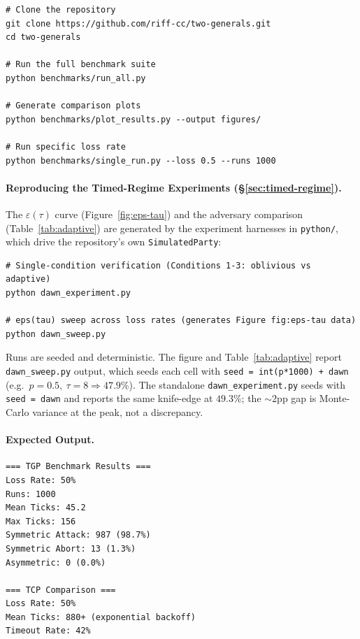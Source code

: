 \begin{verbatim}
# Clone the repository
git clone https://github.com/riff-cc/two-generals.git
cd two-generals

# Run the full benchmark suite
python benchmarks/run_all.py

# Generate comparison plots
python benchmarks/plot_results.py --output figures/

# Run specific loss rate
python benchmarks/single_run.py --loss 0.5 --runs 1000
\end{verbatim}

\paragraph{Reproducing the Timed-Regime Experiments (\S\ref{sec:timed-regime}).}
The $\varepsilon(\tau)$ curve (Figure~\ref{fig:eps-tau}) and the adversary comparison (Table~\ref{tab:adaptive}) are generated by the experiment harnesses in \texttt{python/}, which drive the repository's own \texttt{SimulatedParty}:
\begin{verbatim}
# Single-condition verification (Conditions 1-3: oblivious vs adaptive)
python dawn_experiment.py

# eps(tau) sweep across loss rates (generates Figure fig:eps-tau data)
python dawn_sweep.py
\end{verbatim}
Runs are seeded and deterministic. The figure and Table~\ref{tab:adaptive} report \texttt{dawn\_sweep.py} output, which seeds each cell with \texttt{seed = int(p*1000) + dawn} (e.g.\ $p{=}0.5,\ \tau{=}8 \Rightarrow 47.9\%$). The standalone \texttt{dawn\_experiment.py} seeds with \texttt{seed = dawn} and reports the same knife-edge at $49.3\%$; the ${\sim}2$pp gap is Monte-Carlo variance at the peak, not a discrepancy.

\paragraph{Expected Output.}
\begin{verbatim}
=== TGP Benchmark Results ===
Loss Rate: 50%
Runs: 1000
Mean Ticks: 45.2
Max Ticks: 156
Symmetric Attack: 987 (98.7%)
Symmetric Abort: 13 (1.3%)
Asymmetric: 0 (0.0%)

=== TCP Comparison ===
Loss Rate: 50%
Mean Ticks: 880+ (exponential backoff)
Timeout Rate: 42%
\end{verbatim}
